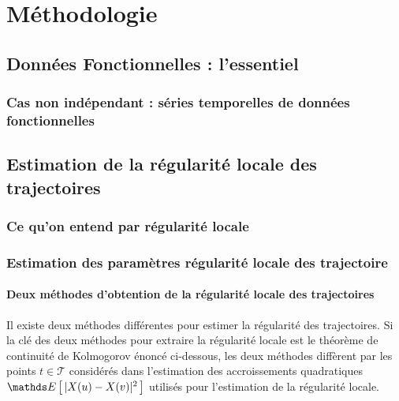 \chapter{Méthodologie}
\minitoc%

\section{Données Fonctionnelles : l'essentiel}

    

    \subsection{Cas non indépendant : séries temporelles de données fonctionnelles}
        
    

\pagebreak

\section{Estimation de la régularité locale des trajectoires}

\subsection{Ce qu'on entend par régularité locale}




\subsection{Estimation des paramètres régularité locale des trajectoire}

\subsubsection{Deux méthodes d'obtention de la régularité locale des trajectoires}

Il existe deux méthodes différentes pour estimer la régularité des trajectoires. Si la clé des deux méthodes pour extraire la régularité locale est le théorème de continuité de Kolmogorov énoncé ci-dessous, les deux méthodes diffèrent par les points $t \in \mathcal T$ considérés dans l'estimation des accroissements quadratiques $\esperance{ \vert X(u) - X(v) \vert^2 }$ utilisés pour l'estimation de la régularité locale. 

